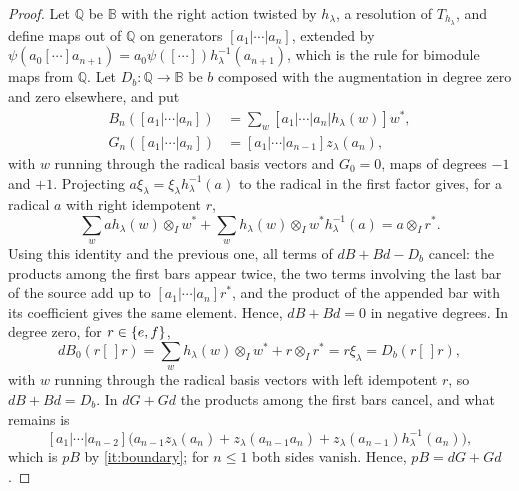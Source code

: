 \begin{proof}
  Let $\mathbb{Q}$ be $\mathbb{B}$ with the right action twisted by $h_\lambda$,
  a resolution of $T_{h_\lambda}$, and define maps out of $\mathbb{Q}$ on
  generators $[a_1|\cdots|a_n]$, extended by ${\psi(a_0[\cdots]a_{n+1})}={
  a_0\psi([\cdots])h_\lambda^{-1}(a_{n+1})}$, which is the rule for bimodule
  maps from $\mathbb{Q}$. Let ${D_b\colon\mathbb{Q}\to\mathbb{B}}$ be $b$
  composed with the augmentation in degree zero and zero elsewhere, and put
  \begin{align*}
    B_n([a_1|\cdots|a_n])&=\sum_w[a_1|\cdots|a_n|h_\lambda(w)]w^*,\\
    G_n([a_1|\cdots|a_n])&=[a_1|\cdots|a_{n-1}]z_\lambda(a_n),
  \end{align*}
  with $w$ running through the radical basis vectors and ${G_0=0}$, maps of
  degrees ${-1}$ and ${+1}$. Projecting ${a\xi_\lambda=\xi_\lambda h_\lambda^{-1}(a)}$
  to the radical in the first factor gives, for a radical $a$ with right
  idempotent $r$,
  \[
    \sum_wah_\lambda(w)\otimes_Iw^*+\sum_wh_\lambda(w)\otimes_I
    w^*h_\lambda^{-1}(a)=a\otimes_Ir^*.
  \]
  Using this identity and the previous one, all terms of ${dB+Bd-D_b}$ cancel:
  the products among the first bars appear twice, the two terms involving the
  last bar of the source add up to $[a_1|\cdots|a_n]r^*$, and the product of
  the appended bar with its coefficient gives the same element. Hence,
  ${dB+Bd=0}$ in negative degrees. In degree zero, for ${r\in\set{e,f}}$,
  \[
    dB_0(r[\,]r)=\sum_wh_\lambda(w)\otimes_Iw^*+r\otimes_Ir^*=r\xi_\lambda=
    D_b(r[\,]r),
  \]
  with $w$ running through the radical basis vectors with left idempotent $r$,
  so ${dB+Bd=D_b}$. In ${dG+Gd}$ the products among the first bars cancel, and what
  remains is
  \[
    [a_1|\cdots|a_{n-2}]\bigl(a_{n-1}z_\lambda(a_n)+z_\lambda(a_{n-1}a_n)+
    z_\lambda(a_{n-1})h_\lambda^{-1}(a_n)\bigr),
  \]
  which is $pB$ by
  \eqref{it:boundary}; for ${n\leq1}$ both sides vanish.
  Hence, ${pB=dG+Gd}$.


\end{proof}
